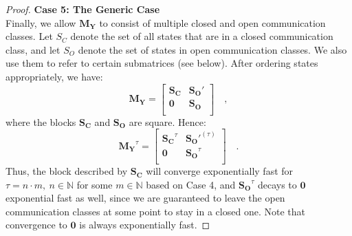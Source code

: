 \documentclass[../../main.tex]{subfiles}
\begin{document}
\begin{proof}
        \textbf{Case 5: The Generic Case} \\
        Finally, we allow $\bm{M_Y}$ to consist of multiple closed and open communication classes. Let $S_C$ denote the set of all states that are in a closed communication class, and let $S_O$ denote the set of states in open communication classes. We also use them to refer to certain submatrices (see below). After ordering states appropriately, we have:
        \[
            \bm{M_Y} = 
            \begin{bmatrix}
            \bm{S_C} & \bm{S_O}' \\
            \bm{0} & \bm{S_O} \\
            \end{bmatrix}
            \quad ,
        \]
        where the blocks $\bm{S_C}$ and $\bm{S_O}$ are square. Hence:
        \[
            \bm{M_Y}^\tau = 
            \begin{bmatrix}
            \bm{S_C}^\tau & \bm{S_O}'^{(\tau)} \\
            \bm{0} & \bm{S_O}^{\tau} \\
            \end{bmatrix}
            \quad .
        \]
        Thus, the block described by $\bm{S_C}$ will converge exponentially fast for  $\tau = n \cdot m, \ n \in \mathbb{N}$ for some $m \in \mathbb{N}$ based on Case 4, and $\bm{S_O}^{\tau}$ decays to $\bm{0}$ exponential fast as well, since we are guaranteed to leave the open communication classes at some point to stay in a closed one. Note that convergence to $\bm{0}$ is always exponentially fast.


\end{proof}
\end{document}
